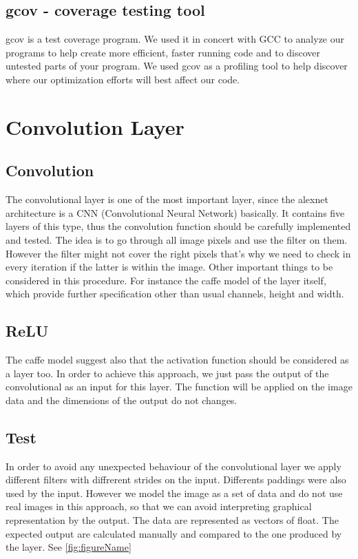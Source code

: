 \documentclass[parskip=full]{scrartcl}
\newcommand\tab[1][1cm]{\hspace*{#1}}
\begin{document}
	\subsection {gcov - coverage testing tool}
	\tab gcov is a test coverage program. We used it in concert with GCC to analyze our programs to help create more efficient, faster running code and to discover untested parts of your program. We used gcov as a profiling tool to help discover where our optimization efforts will best affect our code.


\section {Convolution Layer}
	\subsection {Convolution}
	\tab The convolutional layer is one of the most important layer, since the alexnet architecture is a CNN (Convolutional Neural Network) basically. It contains five layers of this type, thus the convolution function should be carefully implemented and tested.
	The idea is to go through all image pixels and use the filter on them. However the filter might not cover the right pixels that's why we need to check in every iteration if the latter is within the image. Other important things to be considered in this procedure. For instance the caffe model of the layer itself, which provide further specification other than usual channels, height and width.
	
	\subsection {ReLU}
	\tab The caffe model suggest also that the activation function should be considered as a layer too. In order to achieve this approach, we just pass the output of the convolutional as an input for this layer. The function will be applied on the image data and the dimensions of the output do not changes.

	\subsection {Test}
	\tab In order to avoid any unexpected behaviour of the convolutional layer we apply different filters with diffrerent strides on the input. Differents paddings were also used by the input. However we model the image as a set of data and do not use real images
in this approach, so that we can avoid interpreting graphical representation by the output. The data are represented as vectors of float. The expected output are calculated manually and compared to the one produced by the layer. See \ref{fig:figureName}
\end{document}
